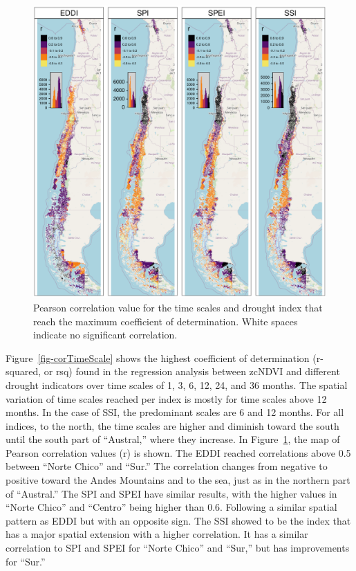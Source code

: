 \documentclass[
  authoryear,
  preprint,
  3p,
  onecolumn]{elsarticle}
\begin{document}
\begin{figure}[!ht]

{\centering \includegraphics{../output/figs/mapa_cor_r_indices_zcNDVI6.png}

}

\caption{\label{fig-corPerson}Pearson correlation value for the time
scales and drought index that reach the maximum coefficient of
determination. White spaces indicate no significant correlation.}

\end{figure}

Figure~\ref{fig-corTimeScale} shows the highest coefficient of
determination (r-squared, or rsq) found in the regression analysis
between zcNDVI and different drought indicators over time scales of 1,
3, 6, 12, 24, and 36 months. The spatial variation of time scales
reached per index is mostly for time scales above 12 months. In the case
of SSI, the predominant scales are 6 and 12 months. For all indices, to
the north, the time scales are higher and diminish toward the south
until the south part of ``Austral,'' where they increase. In
Figure~\ref{fig-corPerson}, the map of Pearson correlation values (r) is
shown. The EDDI reached correlations above 0.5 between ``Norte Chico''
and ``Sur.'' The correlation changes from negative to positive toward
the Andes Mountains and to the sea, just as in the northern part of
``Austral.'' The SPI and SPEI have similar results, with the higher
values in ``Norte Chico'' and ``Centro'' being higher than 0.6.
Following a similar spatial pattern as EDDI but with an opposite sign.
The SSI showed to be the index that has a major spatial extension with a
higher correlation. It has a similar correlation to SPI and SPEI for
``Norte Chico'' and ``Sur,'' but has improvements for ``Sur.''
\end{document}

